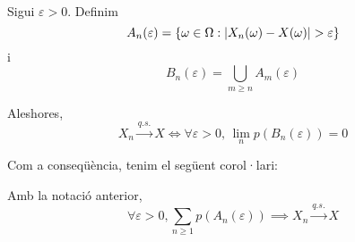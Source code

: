 \begin{lema}
  \-\\
  Sigui $\varepsilon > 0$. Definim $$A_n(\varepsilon) = \left\{\omega \in \Omega : \left\vert X_n(\omega) - 
  X(\omega) \right\vert > \varepsilon\right\}$$ i $$B_n(\varepsilon) = \bigcup_{m\geq n} A_m(\varepsilon)$$
  
  Aleshores,
  \[
    X_n \overset{q.s.}{\to} X \iff \forall \varepsilon > 0, \, \lim_n p(B_n(\varepsilon)) = 0
  \]
\end{lema}

Com a conseqüència, tenim el següent corol·lari:

\begin{col}
  Amb la notació anterior, 
  \[
    \forall \varepsilon > 0, \sum_{n\geq 1}p(A_n(\varepsilon)) \implies X_n \overset{q.s.}{\to} X
  \]
\end{col}

\newpage

